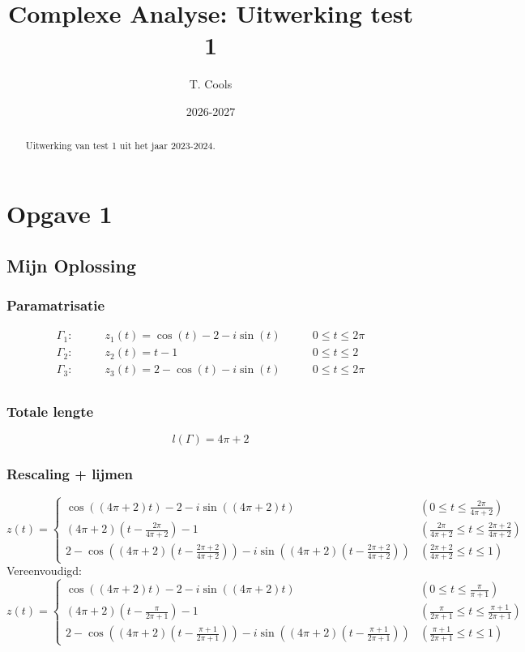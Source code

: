 \documentclass[a4paper,twoside]{article}
\title{Complexe Analyse: Uitwerking test 1}
\author{T. Cools}
\date{2026-2027}
\theoremstyle{definition}
\theoremstyle{plain}
\begin{document}
\begin{abstract}
    Uitwerking van test 1 uit het jaar 2023-2024.
\end{abstract}

\section{Opgave 1}
\subsection{Mijn Oplossing}
\subsubsection{Paramatrisatie}
\begin{align*}
    \Gamma_1: \qquad & z_1(t) = \cos(t) -2 - i \sin(t) \qquad & 0 \leq t \leq 2\pi \\
    \Gamma_2: \qquad & z_2(t) = t-1 \qquad & 0 \leq t \leq 2 \\
    \Gamma_3: \qquad & z_3(t) = 2-\cos(t) - i \sin(t) \qquad & 0 \leq t \leq 2\pi \\
\end{align*}

\subsubsection{Totale lengte}
\[l(\Gamma) = 4\pi +2\]
\subsubsection{Rescaling + lijmen}

\[
z(t) = \begin{cases}
    \cos((4\pi +2)t)-2-i\sin((4\pi + 2)t) & \left(0 \leq t \leq \frac{2\pi}{4\pi + 2}\right) \\
    (4\pi + 2)\left(t-\frac{2\pi}{4\pi + 2}\right)-1 & \left(\frac{2\pi}{4\pi + 2} \leq t \leq \frac{2\pi + 2}{4\pi + 2}\right) \\
    2-\cos\left((4\pi +2)\left(t- \frac{2\pi + 2}{4\pi + 2}\right)\right)-i\sin\left((4\pi + 2)\left(t- \frac{2\pi + 2}{4\pi + 2}\right)\right) & \left(\frac{2\pi + 2}{4\pi + 2} \leq t \leq 1\right)
\end{cases}
\]
Vereenvoudigd:
\[
z(t) = \begin{cases}
    \cos((4\pi +2)t)-2-i\sin((4\pi + 2)t) & \left(0 \leq t \leq \frac{\pi}{\pi + 1}\right) \\
    (4\pi + 2)\left(t-\frac{\pi}{2\pi + 1}\right)-1 & \left(\frac{\pi}{2\pi + 1} \leq t \leq \frac{\pi + 1}{2\pi + 1}\right) \\
    2-\cos\left((4\pi +2)\left(t- \frac{\pi + 1}{2\pi + 1}\right)\right)-i\sin\left((4\pi + 2)\left(t- \frac{\pi + 1}{2\pi + 1}\right)\right) & \left(\frac{\pi + 1}{2\pi + 1} \leq t \leq 1\right)
\end{cases}
\]
\end{document}
